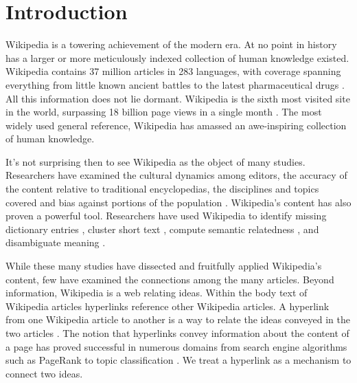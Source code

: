 \documentclass[pre,twocolumn,twoside,superscriptaddress,floatfix, aps, 10pt]{revtex4-1}
\begin{document}
\maketitle



\section{Introduction}



Wikipedia is a towering achievement of the modern era. 
At no point in history has a larger or more meticulously indexed collection of human knowledge 
existed.
Wikipedia contains 37 million articles in 283 languages, 
with coverage spanning everything from little known ancient battles to the latest pharmaceutical drugs 
\cite{stats} \cite{drugs}.
All this information does not lie dormant. 
Wikipedia is the sixth most visited
site in the world, surpassing 18 billion page views in a single month
\cite{wiki_views}.
The most widely used general reference, Wikipedia has amassed an awe-inspiring collection of human knowledge.

It's not surprising then to see Wikipedia as the object of many studies. 
Researchers have examined the cultural dynamics among editors,
\cite{editors}
the accuracy of the content relative to traditional encyclopedias,
\cite{accuracy1}
\cite{accuracy2}
the disciplines and topics covered 
\cite{coverage}
and bias against portions of the population
\cite{bias_women}.
Wikipedia's content has also proven a powerful tool. 
Researchers have used Wikipedia to identify missing dictionary entries
\cite{missing_entries},
cluster short text
\cite{clustering},
compute semantic relatedness
\cite{semantic_relatedness},
and disambiguate meaning \cite{disambiguating}.

While these many studies have dissected and fruitfully applied Wikipedia's content,
few have examined the connections among the many articles.
Beyond information, Wikipedia is a web 
relating ideas. 
Within the body text of Wikipedia articles hyperlinks reference
other Wikipedia articles.
A hyperlink from one Wikipedia article to another is a way to relate the ideas
conveyed in the two articles 
\cite{relevance}.
The notion that hyperlinks convey information about the content of a
page has proved successful in numerous domains from search engine algorithms 
such as PageRank 
\cite{pagerank} 
to topic classification
\cite{classifier}.
We treat a hyperlink as a mechanism to connect two ideas. 
\end{document}
